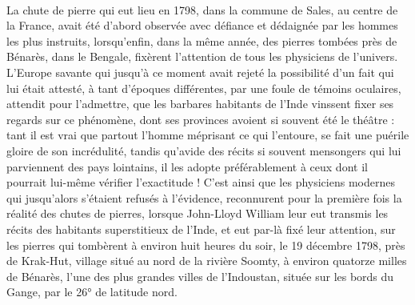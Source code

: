 \documentclass[a4paper, 12pt, oneside, french]{article}
\begin{document}
\paragraph{}
La chute de pierre qui eut lieu en 1798, dans la commune de Sales, au centre de la France, avait été d'abord observée avec défiance et dédaignée par les hommes les plus instruits, lorsqu'enfin, dans la même année, des pierres tombées près de Bénarès, dans le Bengale, fixèrent l'attention de tous les physiciens de l'univers. L'Europe savante qui jusqu'à ce moment avait rejeté la possibilité d'un fait qui lui était attesté, à tant d'époques différentes, par une foule de témoins oculaires, attendit pour l'admettre, que les barbares habitants de l'Inde vinssent fixer ses regards sur ce phénomène, dont ses provinces avoient si souvent été le théâtre : tant il est vrai que partout l'homme méprisant ce qui l'entoure, se fait une puérile gloire de son incrédulité, tandis qu'avide des récits si souvent mensongers qui lui parviennent des pays lointains, il les adopte préférablement à ceux dont il pourrait lui-même vérifier l'exactitude ! C'est ainsi que les physiciens modernes qui jusqu'alors s'étaient refusés à l'évidence, reconnurent pour la première fois la réalité des chutes de pierres, lorsque John-Lloyd William leur eut transmis les récits des habitants superstitieux de l'Inde, et eut par-là fixé leur attention, sur les pierres qui tombèrent à environ huit heures du soir, le 19 décembre 1798, près de Krak-Hut, village situé au nord de la rivière Soomty, à environ quatorze milles de Bénarès, l'une des plus grandes villes de l'Indoustan, située sur les bords du Gange, par le 26° de latitude nord.
\end{document}
